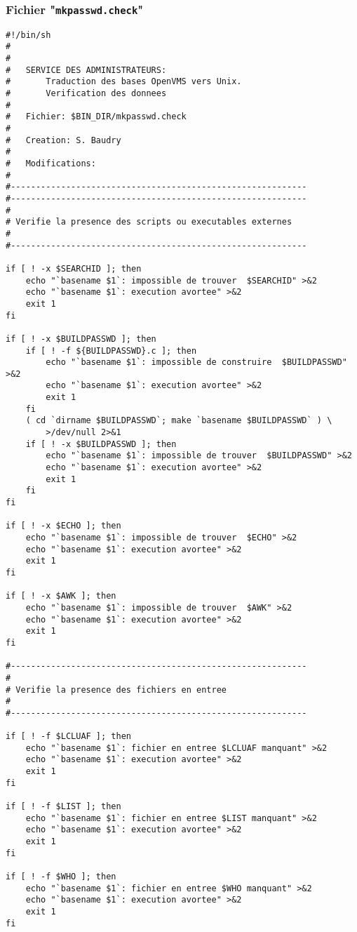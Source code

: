 \subsubsection{\texorpdfstring{\label{adv-programming-ex3-pgmchk}Fichier "{\tt mkpasswd.check}"}{Fichier "mkpasswd.check"}}

\begin{verbatim}
#!/bin/sh
#
#
#   SERVICE DES ADMINISTRATEURS:
#       Traduction des bases OpenVMS vers Unix.
#       Verification des donnees
#
#   Fichier: $BIN_DIR/mkpasswd.check
#
#   Creation: S. Baudry
#
#   Modifications:
#
#-----------------------------------------------------------
#-----------------------------------------------------------
#
# Verifie la presence des scripts ou executables externes
#
#-----------------------------------------------------------

if [ ! -x $SEARCHID ]; then
    echo "`basename $1`: impossible de trouver  $SEARCHID" >&2
    echo "`basename $1`: execution avortee" >&2
    exit 1
fi

if [ ! -x $BUILDPASSWD ]; then
    if [ ! -f ${BUILDPASSWD}.c ]; then
        echo "`basename $1`: impossible de construire  $BUILDPASSWD" >&2
        echo "`basename $1`: execution avortee" >&2
        exit 1
    fi
    ( cd `dirname $BUILDPASSWD`; make `basename $BUILDPASSWD` ) \
        >/dev/null 2>&1
    if [ ! -x $BUILDPASSWD ]; then
        echo "`basename $1`: impossible de trouver  $BUILDPASSWD" >&2
        echo "`basename $1`: execution avortee" >&2
        exit 1
    fi
fi

if [ ! -x $ECHO ]; then
    echo "`basename $1`: impossible de trouver  $ECHO" >&2
    echo "`basename $1`: execution avortee" >&2
    exit 1
fi

if [ ! -x $AWK ]; then
    echo "`basename $1`: impossible de trouver  $AWK" >&2
    echo "`basename $1`: execution avortee" >&2
    exit 1
fi

#-----------------------------------------------------------
#
# Verifie la presence des fichiers en entree
#
#-----------------------------------------------------------

if [ ! -f $LCLUAF ]; then
    echo "`basename $1`: fichier en entree $LCLUAF manquant" >&2
    echo "`basename $1`: execution avortee" >&2
    exit 1
fi

if [ ! -f $LIST ]; then
    echo "`basename $1`: fichier en entree $LIST manquant" >&2
    echo "`basename $1`: execution avortee" >&2
    exit 1
fi

if [ ! -f $WHO ]; then
    echo "`basename $1`: fichier en entree $WHO manquant" >&2
    echo "`basename $1`: execution avortee" >&2
    exit 1
fi


\end{verbatim}
